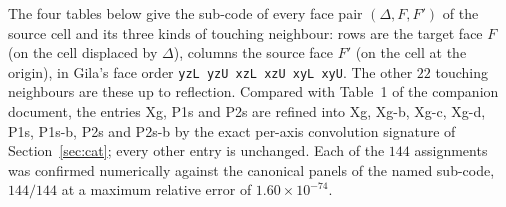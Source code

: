 \documentclass[11pt]{article}
\theoremstyle{remark}
\newcommand{\code}[1]{\texttt{#1}}
\begin{document}
The four tables below give the sub-code of every face pair $(\Delta, F, F')$ of the source
cell and its three kinds of touching neighbour: rows are the target face $F$ (on the cell
displaced by $\Delta$), columns the source face $F'$ (on the cell at the origin), in Gila's
face order \code{yzL yzU xzL xzU xyL xyU}. The other $22$ touching neighbours are these up
to reflection. Compared with Table~1 of the companion document, the entries Xg, P1s and P2s
are refined into Xg, Xg-b, Xg-c, Xg-d, P1s, P1s-b, P2s and P2s-b by the exact per-axis
convolution signature of Section~\ref{sec:cat}; every other entry is unchanged. Each of the
$144$ assignments was confirmed numerically against the canonical panels of the named
sub-code, $144/144$ at a maximum relative error of $1.60\times10^{-74}$.

\begin{center}\small
{}
\qquad
{}
\end{center}
\end{document}

